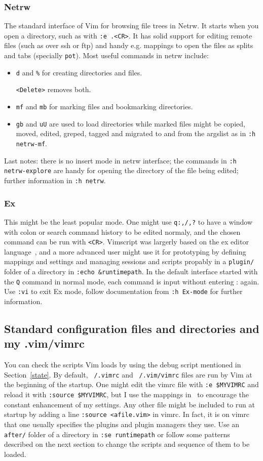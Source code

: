 \documentclass{article}
\newcommand{\ttt}[1] {
	\texttt{<#1>}}
\newcommand{\tttt}[1] {
	\texttt{#1}}
\begin{document}
\subsubsection{Netrw}\label{netrw}
The standard interface of Vim for browsing file trees in Netrw.
It starts when you open a directory, such as with \tttt{:e .<CR>}.
It has solid support for editing remote files (such as over ssh or
ftp) and handy e.g. mappings to open the files as splits and tabs (specially \tttt{pot}).
Most useful commands in netrw include:
\begin{itemize}
  \item \tttt{d} and \tttt{\%} for creating directories and files.
    \ttt{Delete} removes both.
  \item \tttt{mf} and \tttt{mb} for marking files and bookmarking directories.
  \item \tttt{gb} and \tttt{uU} are used to load directories
    while marked files might be copied, moved, edited, greped, tagged and migrated
    to and from the argslist as in \tttt{:h netrw-mf}.
\end{itemize}
Last notes:
there is no insert mode in netrw interface;
the commands in \tttt{:h netrw-explore} are
handy for opening the directory of the
file being edited;
further information in \tttt{:h netrw}.

\subsubsection{Ex}
This might be the least popular mode.
One might use \tttt{q:,/,?} to have a window
with colon or search command history to be edited normaly,
and the chosen command can be run with \ttt{CR}.
Vimscript was largerly based on the ex editor language~\cite{ex},
and a more advanced user might use it for prototyping
by defining mappings and settings and managing sessions and scripts
propably in a \tttt{plugin/} folder of a directory in \tttt{:echo \&runtimepath}.
In the default interface started with the \tttt{Q} command in normal mode,
each command is input without entering : again. Use \tttt{:vi} to exit Ex mode,
follow documentation from \tttt{:h Ex-mode} for further information.

\subsection{Standard configuration files and directories and my .vim/vimrc}
You can check the scripts Vim loads by using the debug script mentioned
in Section~\ref{state}.
By default, \tttt{~/.vimrc} and \tttt{~/.vim/vimrc} files are run by Vim at the beginning of the startup.
One might edit the vimrc file with \tttt{:e \$MYVIMRC}
and reload it with \tttt{:source \$MYVIMRC}, but
I use the mappings in~\cite{vimrc} to encourage the constant enhancement of my settings.
Any other file might be included to run at startup by
adding a line \tttt{:source <afile.vim>} in vimrc.
In fact, it is on vimrc that one usually specifies the plugins
and plugin managers they use.
Use an \tttt{after/} folder of a directory in \tttt{:se runtimepath}
or follow some patterns described on the next section to change the
scripts and sequence of them to be loaded.
\end{document}
